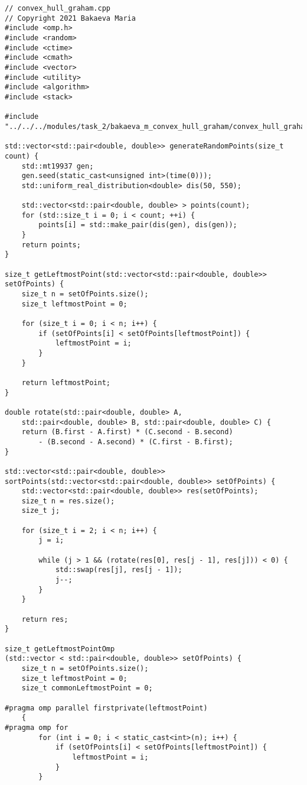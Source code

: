 \documentclass{report}
\begin{document}
\begin{lstlisting}
// convex_hull_graham.cpp
// Copyright 2021 Bakaeva Maria
#include <omp.h>
#include <random>
#include <ctime>
#include <cmath>
#include <vector>
#include <utility>
#include <algorithm>
#include <stack>

#include "../../../modules/task_2/bakaeva_m_convex_hull_graham/convex_hull_graham.h"

std::vector<std::pair<double, double>> generateRandomPoints(size_t count) {
    std::mt19937 gen;
    gen.seed(static_cast<unsigned int>(time(0)));
    std::uniform_real_distribution<double> dis(50, 550);

    std::vector<std::pair<double, double> > points(count);
    for (std::size_t i = 0; i < count; ++i) {
        points[i] = std::make_pair(dis(gen), dis(gen));
    }
    return points;
}

size_t getLeftmostPoint(std::vector<std::pair<double, double>> setOfPoints) {
    size_t n = setOfPoints.size();
    size_t leftmostPoint = 0;

    for (size_t i = 0; i < n; i++) {
        if (setOfPoints[i] < setOfPoints[leftmostPoint]) {
            leftmostPoint = i;
        }
    }

    return leftmostPoint;
}

double rotate(std::pair<double, double> A,
    std::pair<double, double> B, std::pair<double, double> C) {
    return (B.first - A.first) * (C.second - B.second)
        - (B.second - A.second) * (C.first - B.first);
}

std::vector<std::pair<double, double>>
sortPoints(std::vector<std::pair<double, double>> setOfPoints) {
    std::vector<std::pair<double, double>> res(setOfPoints);
    size_t n = res.size();
    size_t j;

    for (size_t i = 2; i < n; i++) {
        j = i;

        while (j > 1 && (rotate(res[0], res[j - 1], res[j])) < 0) {
            std::swap(res[j], res[j - 1]);
            j--;
        }
    }

    return res;
}

size_t getLeftmostPointOmp
(std::vector < std::pair<double, double>> setOfPoints) {
    size_t n = setOfPoints.size();
    size_t leftmostPoint = 0;
    size_t commonLeftmostPoint = 0;

#pragma omp parallel firstprivate(leftmostPoint)
    {
#pragma omp for
        for (int i = 0; i < static_cast<int>(n); i++) {
            if (setOfPoints[i] < setOfPoints[leftmostPoint]) {
                leftmostPoint = i;
            }
        }


\end{lstlisting}
\end{document}
